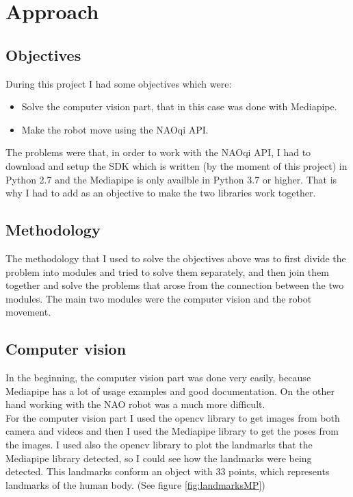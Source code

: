 \documentclass[conference]{IEEEtran}
\begin{document}
\section{Approach}

\subsection{Objectives}

During this project I had some objectives which were:
\begin{itemize}
\item Solve the computer vision part, that in this case was done with Mediapipe.
\item Make the robot move using the NAOqi API.

\end{itemize}
The problems were that, in order to work with the NAOqi API, I had to download and setup the SDK which is written (by the moment of this project) in Python 2.7 and the Mediapipe is only availble in Python 3.7 or higher. That is why I had to add as an objective to make the two libraries work together.


\subsection{Methodology}
The methodology that I used to solve the objectives above was to first divide the problem into modules and tried to solve them separately, and then join them together and solve the problems that arose from the connection between the two modules.
The main two modules were the computer vision and the robot movement.


\subsection{Computer vision}
In the beginning, the computer vision part was done very easily, because Mediapipe has a lot of usage examples and good documentation. On the other hand working with the NAO robot was a much more difficult.
\\
For the computer vision part I used the opencv library to get images from both camera and videos and then I used the Mediapipe library to get the poses from the images.
I used also the opencv library to plot the landmarks that the Mediapipe library detected, so I could see how the landmarks were being detected. This landmarks conform an object with 33 points, which represents landmarks of the human body. (See figure \ref{fig:landmarksMP})
\end{document}
